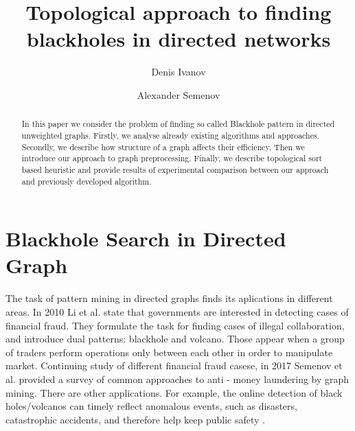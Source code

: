 \documentclass{svproc}
\begin{document}
\mainmatter              %
%
\title{Topological approach to finding blackholes in directed networks}
%
%
\author{Denis Ivanov \and Alexander Semenov}
%
%
%

\maketitle              %

\begin{abstract}
In this paper we consider the problem of finding so called Blackhole pattern in directed unweighted graphs.
Firstly, we analyse already existing algorithms and approaches. Secondly, we describe how structure of a graph
affects their efficiency. Then we introduce our approach to graph preprocessing. Finally, we describe topological sort based heuristic
and provide results of experimental comparison between our approach and previously developed algorithm.
\end{abstract}

\section{Blackhole Search in Directed Graph}
The task of pattern mining in directed graphs finds its aplications in different areas. In 2010 Li et al.\cite{li2010mining} state
that governments are interested in detecting cases of financial fraud. They formulate the task for finding cases of illegal collaboration, and introduce dual patterns:
blackhole and volcano. Those appear when a group of traders perform operations only between each other in order to manipulate market.
Continuing study of different financial fraud casese, in 2017 Semenov et al. \cite{semenov2017survey} provided a survey of common approaches to anti - money laundering by graph mining.
There are other applications. For example, the online detection of black holes/volcanos can timely 
reflect anomalous events, such as disasters, catastrophic accidents, and therefore help keep public safety \cite{hong2015detecting}.
\end{document}
